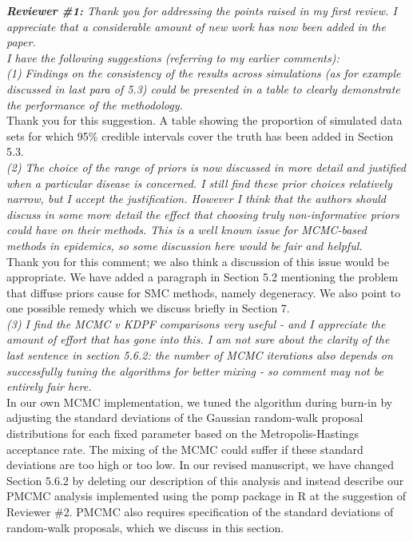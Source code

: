 \documentclass{article}
\begin{document}
\noindent \emph{{\bf Reviewer \#1:} Thank you for addressing the points raised in my first review. I appreciate that a considerable amount of new work has now been added in the paper.} \\

\noindent \emph{I have the following suggestions (referring to my earlier comments):} \\

\noindent \emph{(1) Findings on the consistency of the results across simulations (as for example discussed in last para of 5.3) could be presented in a table to clearly demonstrate the performance of the methodology.} \\

Thank you for this suggestion. A table showing the proportion of simulated data sets for which 95\% credible intervals cover the truth has been added in Section 5.3. \\

\noindent \emph{(2) The choice of the range of priors is now discussed in more detail and justified when a particular disease is concerned. I still find these prior choices relatively narrow, but I accept the justification. However I think that the authors should discuss in some more detail the effect that choosing truly non-informative priors could have on their methods. This is a well known issue for MCMC-based methods in epidemics, so some discussion here would be fair and helpful.} \\

Thank you for this comment; we also think a discussion of this issue would be appropriate. We have added a paragraph in Section 5.2 mentioning the problem that diffuse priors cause for SMC methods, namely degeneracy. We also point to one possible remedy which we discuss briefly in Section 7. \\

\noindent \emph{(3) I find the MCMC v KDPF comparisons very useful - and I appreciate the amount of effort that has gone into this. I am not sure about the clarity of the last sentence in section 5.6.2: the number of MCMC iterations also depends on successfully tuning the algorithms for better mixing - so comment may not be entirely fair here.} \\

In our own MCMC implementation, we tuned the algorithm during burn-in by adjusting the standard deviations of the Gaussian random-walk proposal distributions for each fixed parameter based on the Metropolis-Hastings acceptance rate. The mixing of the MCMC could suffer if these standard deviations are too high or too low. In our revised manuscript, we have changed Section 5.6.2 by deleting our description of this analysis and instead describe our PMCMC analysis implemented using the pomp package in R at the suggestion of Reviewer \#2. PMCMC also requires specification of the standard deviations of random-walk proposals, which we discuss in this section. \\
\end{document}
